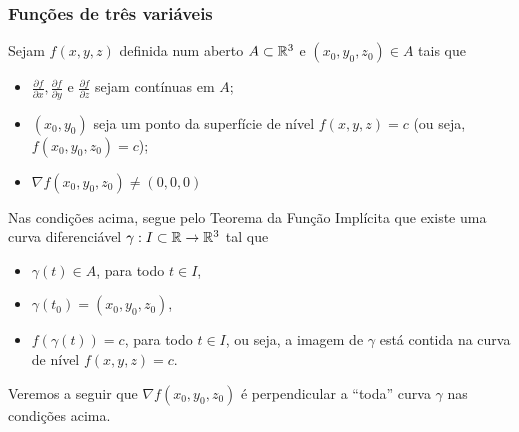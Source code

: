 \subsubsection{Funções de três variáveis}

Sejam \(f(x,y,z)\) definida num aberto \(A\subset\mathbb{R}^3\) e \((x_0,y_0,z_0)\in A\) tais que
    \begin{itemize}
        \item \(\frac{\partial f}{\partial x}, \frac{\partial f}{\partial y}\) e \(\frac{\partial f}{\partial z}\) sejam contínuas em \(A\);
        \item \((x_0,y_0)\) seja um ponto da superfície de nível \(f(x,y,z)=c\) (ou seja, \(f(x_0,y_0,z_0)=c\));
        \item \(\nabla f(x_0,y_0,z_0) \neq (0,0,0)\) %
    \end{itemize}

Nas condições acima, segue pelo Teorema da Função Implícita que existe uma curva diferenciável \(\gamma: I\subset\mathbb{R} \to\mathbb{R}^3\) tal que
    \begin{itemize}
        \item \(\gamma(t) \in A\), para todo \(t\in I\),
        \item \(\gamma(t_0) = (x_0,y_0,z_0)\),
        \item \(f(\gamma(t)) = c\), para todo \(t\in I\), ou seja, a imagem de \(\gamma\) está contida na curva de nível \(f(x,y,z) = c\).
    \end{itemize}

Veremos a seguir que \(\nabla f(x_0,y_0,z_0)\) é perpendicular a ``toda'' curva \(\gamma\) nas condições acima.

